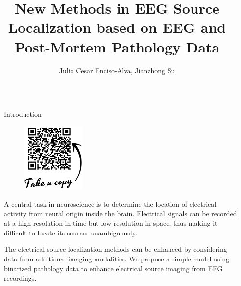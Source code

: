\documentclass[final]{beamer}
\title{New Methods in EEG Source Localization based
on EEG and Post-Mortem Pathology Data}
\author{Julio Cesar Enciso-Alva, Jianzhong Su}
\institute[shortinst]{The University of Texas at Arlington}
\newlength{\sepwidth}
\newlength{\colwidth}
\newcommand{\separatorcolumn}{\begin{column}{\sepwidth}\end{column}}
\begin{document}
\begin{frame}[t]
\begin{columns}[t]
\separatorcolumn

\begin{column}{\colwidth}

  \begin{block}{Introduction}

\begin{figure}
  \begin{center}
    \includegraphics[width=0.3\textwidth]{figures/qr_code.png}
  \end{center}
\end{figure}

A central task in neuroscience is to determine the location of electrical activity from neural origin inside the brain. Electrical signals can be recorded at a high resolution in time but low resolution in space, thus making it difficult to locate its sources unambiguously. 

The electrical source localization methods can be enhanced by considering data from additional imaging modalities. We propose a simple model using binarized pathology data to enhance electrical source imaging from EEG recordings. 

  \end{block}


\end{column}
\end{columns}
\end{frame}
\end{document}
